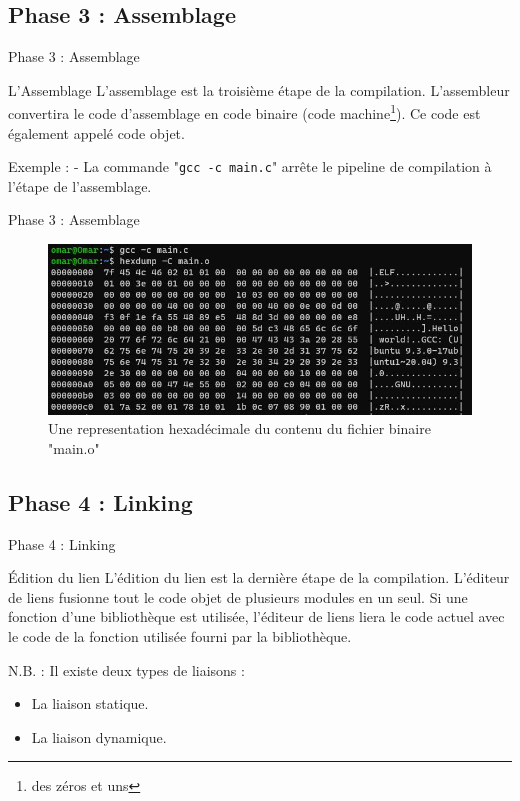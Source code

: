 \subsection{Phase 3 : Assemblage}
\begin{frame}{Phase 3 : Assemblage}
	\begin{block}{L'Assemblage}
		\alert{L'assemblage } est la troisième étape de la compilation. L'assembleur convertira le code d'assemblage en code binaire (code machine\footnote[frame]{des zéros et uns}). Ce code est également appelé \alert{code objet}.
	\end{block}
	\begin{exampleblock}{Exemple :}
		- La commande "\texttt{gcc -c main.c}" arrête le pipeline de compilation à l'étape de l'assemblage.\\
	\end{exampleblock}
\end{frame}
\begin{frame}{Phase 3 : Assemblage}
	\begin{figure}[b]
		\centering
		\includegraphics[scale=0.5]{resources/hello_world_o}
		\caption{Une representation hexadécimale du contenu du fichier binaire "main.o"}
	\end{figure}
\end{frame}

\subsection{Phase 4 : Linking}
\begin{frame}{Phase 4 : Linking}
	\begin{block}{Édition du lien}
		\alert{L'édition du lien } est la dernière étape de la compilation. L'éditeur de liens \alert{fusionne } tout le code objet de plusieurs modules en un seul. \alert{Si} une fonction d'une bibliothèque est utilisée, l'éditeur de liens \alert{liera} le code actuel avec le code de la fonction utilisée \alert{fourni} par la bibliothèque.
	\end{block}
	\begin{alertblock}{N.B. :}
		Il existe deux types de liaisons :
		\begin{itemize}
			\item La \alert{liaison statique}.
			\item La \alert{liaison dynamique}.
		\end{itemize}
	\end{alertblock}
\end{frame}

